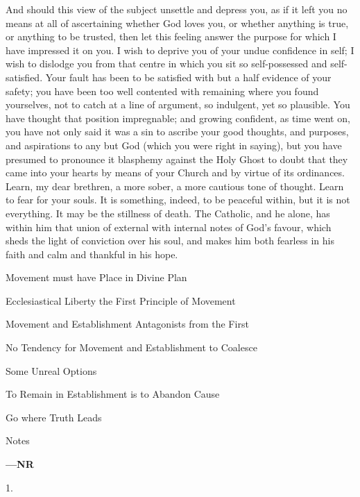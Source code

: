 And should this view of the subject unsettle and depress you, as if
it left you no means at all of ascertaining whether God loves you, or
whether anything is true, or anything to be trusted, then let this
feeling answer the purpose for which I have impressed it on you. I
wish to deprive you of your undue confidence in self; I wish to
dislodge you from that centre in which you sit so self-possessed and
self-satisfied. Your fault has been to be satisfied with but a half
evidence of your safety; you have been too well contented with
remaining where you found yourselves, not to catch at a line of
argument, so indulgent, yet so plausible. You have thought that
position impregnable; and growing confident, as time went on, you have
not only said it was a sin to ascribe your good thoughts, and
purposes, and aspirations to any but God (which you were right in
saying), but you have presumed to pronounce it blasphemy against the
Holy Ghost to doubt that they came into your hearts by means of your
Church and by virtue of its ordinances. Learn, my dear brethren, a
more sober, a more cautious tone of thought. Learn to fear for your
souls. It is something, indeed, to be peaceful within, but it is not
everything. It may be the stillness of death. The Catholic, and he
alone, has within him that union of external with internal notes of
God's favour, which sheds the light of conviction over his soul, and
makes him both fearless in his faith and calm and thankful in his
hope.


Movement must have Place in Divine
Plan

Ecclesiastical Liberty the First Principle of
Movement

Movement and Establishment Antagonists from
the First

No Tendency for Movement and Establishment to
Coalesce

Some Unreal Options

To Remain in Establishment is to
Abandon Cause

Go where Truth Leads

Notes

\textbf{—NR}

1.

